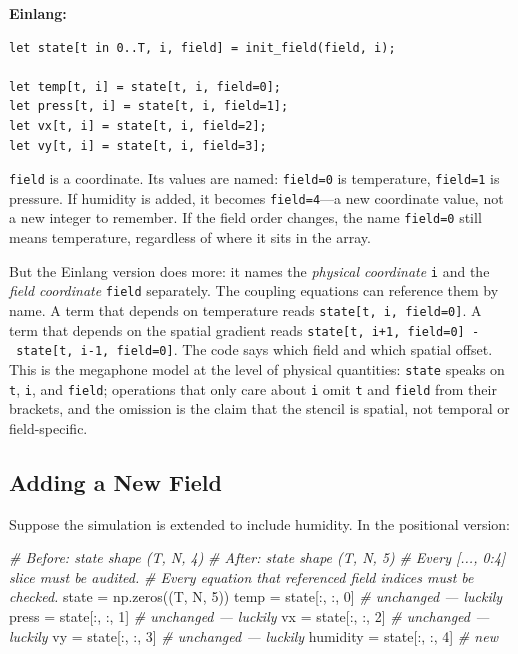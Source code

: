 \documentclass[11pt,titlepage]{article}
\newenvironment{Shaded}{}{}
\newcommand{\CommentTok}[1]{\textcolor[rgb]{0.38,0.63,0.69}{\textit{#1}}}
\newcommand{\DecValTok}[1]{\textcolor[rgb]{0.25,0.63,0.44}{#1}}
\newcommand{\NormalTok}[1]{#1}
\newcommand{\OperatorTok}[1]{\textcolor[rgb]{0.40,0.40,0.40}{#1}}
\begin{document}
\textbf{Einlang:}

\begin{verbatim}
let state[t in 0..T, i, field] = init_field(field, i);

let temp[t, i] = state[t, i, field=0];
let press[t, i] = state[t, i, field=1];
let vx[t, i] = state[t, i, field=2];
let vy[t, i] = state[t, i, field=3];
\end{verbatim}

\texttt{field} is a coordinate. Its values are named: \texttt{field=0}
is temperature, \texttt{field=1} is pressure. If humidity is added, it
becomes \texttt{field=4}---a new coordinate value, not a new integer to
remember. If the field order changes, the name \texttt{field=0} still
means temperature, regardless of where it sits in the array.

But the Einlang version does more: it names the \emph{physical
coordinate} \texttt{i} and the \emph{field coordinate} \texttt{field}
separately. The coupling equations can reference them by name. A term
that depends on temperature reads \texttt{state{[}t,\ i,\ field=0{]}}. A
term that depends on the spatial gradient reads
\texttt{state{[}t,\ i+1,\ field=0{]}\ -\ state{[}t,\ i-1,\ field=0{]}}.
The code says which field and which spatial offset. This is the
megaphone model at the level of physical quantities: \texttt{state}
speaks on \texttt{t}, \texttt{i}, and \texttt{field}; operations that
only care about \texttt{i} omit \texttt{t} and \texttt{field} from their
brackets, and the omission is the claim that the stencil is spatial, not
temporal or field-specific.

\vspace{2em}

\hypertarget{adding-a-new-field}{%
\subsection{Adding a New Field}\label{adding-a-new-field}}

Suppose the simulation is extended to include humidity. In the
positional version:

\begin{Shaded}
\begin{Highlighting}[]
\CommentTok{# Before: state shape (T, N, 4)}
\CommentTok{# After:  state shape (T, N, 5)}
\CommentTok{# Every [..., 0:4] slice must be audited.}
\CommentTok{# Every equation that referenced field indices must be checked.}
\NormalTok{state }\OperatorTok{=}\NormalTok{ np.zeros((T, N, }\DecValTok{5}\NormalTok{))}
\NormalTok{temp }\OperatorTok{=}\NormalTok{ state[:, :, }\DecValTok{0}\NormalTok{]      }\CommentTok{# unchanged — luckily}
\NormalTok{press }\OperatorTok{=}\NormalTok{ state[:, :, }\DecValTok{1}\NormalTok{]     }\CommentTok{# unchanged — luckily}
\NormalTok{vx }\OperatorTok{=}\NormalTok{ state[:, :, }\DecValTok{2}\NormalTok{]        }\CommentTok{# unchanged — luckily}
\NormalTok{vy }\OperatorTok{=}\NormalTok{ state[:, :, }\DecValTok{3}\NormalTok{]        }\CommentTok{# unchanged — luckily}
\NormalTok{humidity }\OperatorTok{=}\NormalTok{ state[:, :, }\DecValTok{4}\NormalTok{]  }\CommentTok{# new}
\end{Highlighting}
\end{Shaded}
\end{document}
